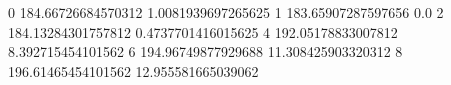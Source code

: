 0 184.66726684570312 1.0081939697265625
1 183.65907287597656 0.0
2 184.13284301757812 0.4737701416015625
4 192.05178833007812 8.392715454101562
6 194.96749877929688 11.308425903320312
8 196.61465454101562 12.955581665039062
